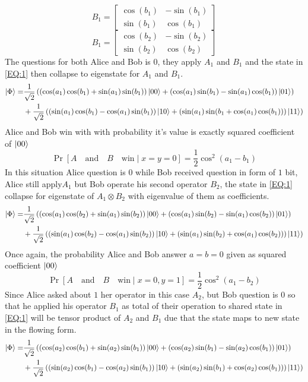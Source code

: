 \[
B_1=
  \begin{bmatrix}
   \cos(b_1) & -\sin(b_1)\\
   \sin(b_1) & \cos(b_1)
  \end{bmatrix}
\]
\[
B_1=
  \begin{bmatrix}
   \cos(b_2) & -\sin(b_2)\\
   \sin(b_2) & \cos(b_2)
  \end{bmatrix}
\]
The questions  for both Alice and Bob is  $0$, they apply $A_1$ and $B_1$ and the state in \ref{EQ:1} then collapse to eigenstate for $A_1$ and $B_1$.
\begin{align*}
\ket{\Phi}=&\frac{1}{\sqrt{2}}\left( \left(\cos(a_1) \cos(b_1) +\sin(a_1) \sin(b_1)\right)\ket{00}  +\left(\cos(a_1) \sin(b_1) -\sin(a_1) \cos(b_1)\right)\ket{01}\right)\\
&+\frac{1}{\sqrt{2}}\left(\left(\sin(a_1) \cos(b_1)-\cos(a_1) \sin(b_1)\right)\ket{10} +\left(\sin(a_1) \sin(b_1+\cos(a_1) \cos(b_1) )\right)\ket{11}\right)
\end{align*}
Alice and Bob win with with probability  it's value is exactly squared  coefficient of $\ket{00} $
$$\Pr[A\quad \text{and}\quad B \quad \text{win}\mid   x=y=0]=\frac{1}{2}\cos^2(a_1-b_1)$$
In this situation Alice question is $0$ while Bob received question in form of $1$ bit, Alice still apply$A_1$ but Bob operate his second operator $B_2$, the state in \ref{EQ:1} collapse for eigenstate of $A_1 \otimes B_2$ with eigenvalue of them as coefficients.
 \begin{align*}
\ket{\Phi}=&\frac{1}{\sqrt{2}}\left( \left(\cos(a_1) \cos(b_2) +\sin(a_1) \sin(b_2)\right)\ket{00}  +\left(\cos(a_1) \sin(b_2) -\sin(a_1) \cos(b_2)\right)\ket{01}\right)\\
&+\frac{1}{\sqrt{2}}\left(\left(\sin(a_1) \cos(b_2)-\cos(a_1) \sin(b_2)\right)\ket{10} +\left(\sin(a_1) \sin(b_2)+\cos(a_1) \cos(b_2) )\right)\ket{11}\right)
\end{align*}
Once again, the probability  Alice and Bob answer $a=b=0$  given as squared coefficient  $\ket{00}$
$$\Pr[A\quad \text{and}\quad B \quad \text{win}\mid   x=0 ,y=1]=\frac{1}{2}\cos^2(a_1-b_2)$$
Since Alice asked about $1$ her operator in this case $A_2$, but Bob question is $0$ so that he applied his operator $B_1$ as total of their operation to shared state in  \ref{EQ:1} will be tensor product of $A_2$ and $B_1$ due that the state maps to new state in the flowing form.
\begin{align*}
\ket{\Phi}=&\frac{1}{\sqrt{2}}\left( \left(\cos(a_2) \cos(b_1) +\sin(a_2) \sin(b_1)\right)\ket{00}  +\left(\cos(a_2) \sin(b_1) -\sin(a_2) \cos(b_1)\right)\ket{01}\right)\\
&+\frac{1}{\sqrt{2}}\left(\left(\sin(a_2) \cos(b_1)-\cos(a_2) \sin(b_1)\right)\ket{10} +\left(\sin(a_2) \sin(b_1)+\cos(a_2) \cos(b_1) )\right)\ket{11}\right)
\end{align*}
